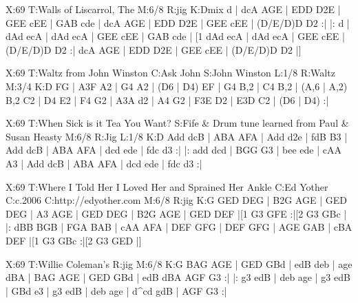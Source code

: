 \documentclass{article}
\begin{document}
\begin{abc}[name]
X:69
T:Walls of Liscarrol, The
M:6/8
R:jig
K:Dmix
d | dcA AGE | EDD D2E | GEE cEE | GAB cde |
dcA AGE | EDD D2E | GEE cEE | (D/E/D)D D2 :|
|: d | dAd ecA | dAd ecA | GEE cEE | GAB cde |
[1 dAd ecA | dAd ecA | GEE cEE | (D/E/D)D D2 :|
dcA AGE | EDD D2E | GEE cEE | (D/E/D)D D2 |]
\end{abc}

\begin{abc}[name]
X:69
T:Waltz from John Winston
C:Ask John
S:John Winston
L:1/8
R:Waltz
M:3/4
K:D
FG | A3F A2 | G4 A2 | (D6 | D4) EF | G4 B,2 | C4 B,2 | (A,6 | A,2) B,2 C2 |
D4 E2 | F4 G2 | A3A d2 | A4 G2 | F3E D2 | E3D C2 | (D6 | D4) :|
\end{abc}

\begin{abc}[name]
X:69
T:When Sick is it Tea You Want?
S:Fife & Drum tune learned from Paul & Susan Heasty
M:6/8
R:Jig
L:1/8
K:D
Add dcB | ABA AFA | Add d2e | fdB B3 |
Add dcB | ABA AFA | dcd ede | fdc d3 :|
|: add dcd | BGG G3 | bee ede | cAA A3 |
Add dcB | ABA AFA | dcd ede | fdc d3 :|
\end{abc}

\begin{abc}[name]
X:69
T:Where I Told Her I Loved Her and Sprained Her Ankle
C:Ed Yother
C:c.2006
C:http://edyother.com
M:6/8
R:jig
K:G
GED DEG | B2G AGE | GED DEG | A3 AGE |
GED DEG | B2G AGE | GED DEF |[1 G3 GFE :|[2 G3 GBc |
|: dBB BGB | FGA BAB | cAA AFA | DEF GFG |
DEF GFG | AGE GAB | cBA DEF |[1 G3 GBc :|[2 G3 GED |]
\end{abc}

\begin{abc}[name]
X:69
T:Willie Coleman's
R:jig
M:6/8
K:G
BAG AGE | GED GBd | edB deb | age dBA |
BAG AGE | GED GBd | edB dBA AGF G3 :|
|: g3 edB | deb age | g3 edB | GBd e3 |
g3 edB | deb age | d^cd gdB | AGF G3 :|
\end{abc}
\end{document}
